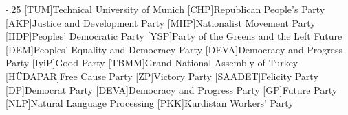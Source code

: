\documentclass[headsepline,footsepline,footinclude=false,oneside,fontsize=11pt,paper=a4,listof=totoc,bibliography=totoc]{scrbook} %
\begin{document}


\frontmatter{}





\tableofcontents{}

\mainmatter{}


% 







\appendix{}


\begin{acronym}
	\itemsep-.25\baselineskip
	[TUM]{Technical University of Munich}
	[CHP]{Republican People's Party}
	[AKP]{Justice and Development Party}
	[MHP]{Nationalist Movement Party}
	[HDP]{Peoples' Democratic Party}
	[YSP]{Party of the Greens and the Left Future}
	[DEM]{Peoples' Equality and Democracy Party}
	[DEVA]{Democracy and Progress Party}
	[IyiP]{Good Party}
	[TBMM]{Grand National Assembly of Turkey}
	[HÜDAPAR]{Free Cause Party}
	[ZP]{Victory Party}
	[SAADET]{Felicity Party}
	[DP]{Democrat Party}
	[DEVA]{Democracy and Progress Party}
	[GP]{Future Party}
	[NLP]{Natural Language Processing}
	[PKK]{Kurdistan Workers' Party}
\end{acronym}

\listoffigures{}
\listoftables{}
\printbibliography{}
\end{document}
